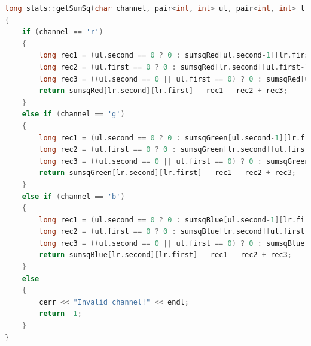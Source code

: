 \documentclass[UTF8]{ctexart}
\begin{document}
\begin{lstlisting}[language=C++,caption={stats.cpp},label={stats.cpp}]
long stats::getSumSq(char channel, pair<int, int> ul, pair<int, int> lr)                                                                                    
{                                                                                                                                                         
    if (channel == 'r')                                                                                                                                   
    {
        long rec1 = (ul.second == 0 ? 0 : sumsqRed[ul.second-1][lr.first]);
        long rec2 = (ul.first == 0 ? 0 : sumsqRed[lr.second][ul.first-1]);
        long rec3 = ((ul.second == 0 || ul.first == 0) ? 0 : sumsqRed[ul.second-1][ul.first-1]);
        return sumsqRed[lr.second][lr.first] - rec1 - rec2 + rec3;             
    }
    else if (channel == 'g')                                                                                                                              
    {
        long rec1 = (ul.second == 0 ? 0 : sumsqGreen[ul.second-1][lr.first]);
        long rec2 = (ul.first == 0 ? 0 : sumsqGreen[lr.second][ul.first-1]);
        long rec3 = ((ul.second == 0 || ul.first == 0) ? 0 : sumsqGreen[ul.second-1][ul.first-1]);
        return sumsqGreen[lr.second][lr.first] - rec1 - rec2 + rec3;        
    }
    else if (channel == 'b')                                                                                                                              
    {
        long rec1 = (ul.second == 0 ? 0 : sumsqBlue[ul.second-1][lr.first]);
        long rec2 = (ul.first == 0 ? 0 : sumsqBlue[lr.second][ul.first-1]);
        long rec3 = ((ul.second == 0 || ul.first == 0) ? 0 : sumsqBlue[ul.second-1][ul.first-1]);
        return sumsqBlue[lr.second][lr.first] - rec1 - rec2 + rec3;            
    }
    else                                                                                                                                                  
    {                                                                                                                                                     
        cerr << "Invalid channel!" << endl;                                                                                                               
        return -1;                                                                                                                                        
    }                                                                                                                                                     
}  


\end{lstlisting}
\end{document}

